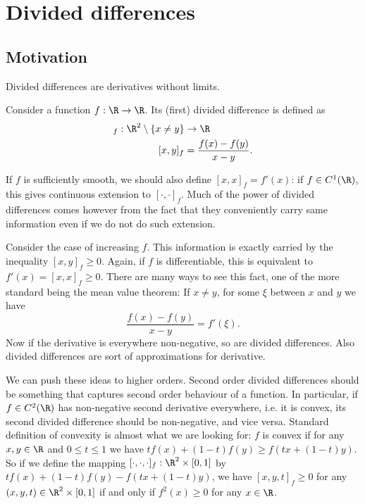 \chapter{Divided differences}

\section{Motivation}
Divided differences are derivatives without limits.

Consider a function $f : \R \to \R$. Its (first) divided difference is defined as
\begin{align*}
	[\cdot , \cdot]_{f} : \R^{2} \setminus \{x \neq y\} &\to \R \\
	[x, y]_{f} &= \frac{f(x) - f(y)}{x - y}.
\end{align*}

If $f$ is sufficiently smooth, we should also define $[x, x]_{f} = f'(x)$: if $f \in C^{1}(\R)$, this gives continuous extension to $[\cdot, \cdot]_{f}$. Much of the power of divided differences comes however from the fact that they conveniently carry same information even if we do not do such extension.

Consider the case of increasing $f$. This information is exactly carried by the inequality $[x, y]_{f} \geq 0$. Again, if $f$ is differentiable, this is equivalent to $f'(x) = [x, x]_{f} \geq 0$. There are many ways to see this fact, one of the more standard being the mean value theorem: If $x \neq y$, for some $\xi$ between $x$ and $y$ we have
\[
	\frac{f(x) - f(y)}{x - y} = f'(\xi).
\]
Now if the derivative is everywhere non-negative, so are divided differences. Also divided differences are sort of approximations for derivative.

We can push these ideas to higher orders. Second order divided differences should be something that captures second order behaviour of a function. In particular, if $f \in C^{2}(\R)$ has non-negative second derivative everywhere, i.e. it is convex, its second divided difference should be non-negative, and vice versa. Standard definition of convexity is almost what we are looking for: $f$ is convex if for any $x, y \in \R$ and $0 \leq t \leq 1$ we have $t f(x) + (1 - t) f(y) \geq f(t x + (1 - t)y)$. So if we define the mapping $[\cdot, \cdot, \cdot]_{f} : \R^{2} \times [0, 1]$ by $t f(x) + (1 - t) f(y) - f(t x + (1 - t)y)$, we have $[x, y, t]_{f} \geq 0$ for any $(x, y, t) \in \R^{2} \times [0, 1]$ if and only if $f^{2}(x) \geq 0$ for any $x \in \R$.

